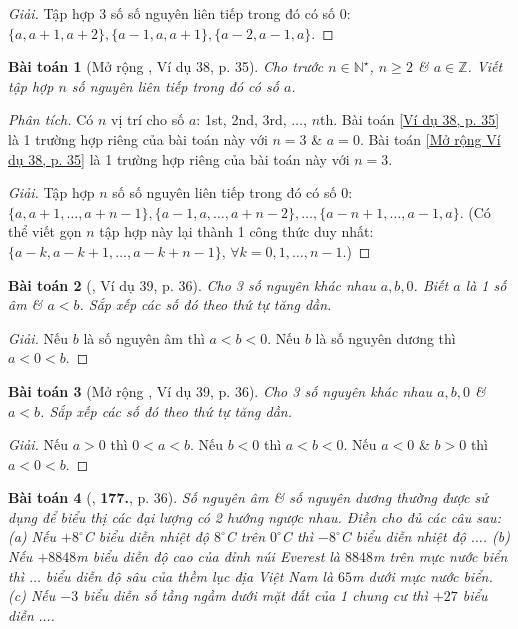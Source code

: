 \documentclass{article}
\numberwithin{equation}{section}
\newtheorem{baitoan}{Bài toán}
\begin{document}
\begin{proof}[Giải]
	Tập hợp 3 số số nguyên liên tiếp trong đó có số $0$: $\{a,a + 1,a + 2\},\{a - 1,a,a + 1\},\{a - 2,a - 1,a\}$.
\end{proof}

\begin{baitoan}[Mở rộng \cite{Tuyen_Toan_6}, Ví dụ 38, p. 35]
	\label{prob: Mở rộng Ví dụ 38, p. 35}
	Cho trước $n\in\mathbb{N}^\star$, $n\ge2$ \& $a\in\mathbb{Z}$. Viết tập hợp $n$ số nguyên liên tiếp trong đó có số $a$.
\end{baitoan}
\noindent\textit{Phân tích.} Có $n$ vị trí cho số $a$: 1st, 2nd, 3rd, $\ldots$, $n$th. Bài toán \ref{Ví dụ 38, p. 35} là 1 trường hợp riêng của bài toán này với $n = 3$ \& $a = 0$. Bài toán \ref{Mở rộng Ví dụ 38, p. 35} là 1 trường hợp riêng của bài toán này với $n = 3$.

\begin{proof}[Giải]
	Tập hợp $n$ số số nguyên liên tiếp trong đó có số $0$: $\{a,a + 1,\ldots,a + n - 1\},\{a - 1,a,\ldots,a + n - 2\},\ldots,\{a - n + 1,\ldots,a - 1,a\}$. (Có thể viết gọn $n$ tập hợp này lại thành 1 công thức duy nhất: $\{a - k,a - k + 1,\ldots,a - k + n - 1\}$, $\forall k = 0,1,\ldots,n - 1$.)
\end{proof}

\begin{baitoan}[\cite{Tuyen_Toan_6}, Ví dụ 39, p. 36]
	Cho 3 số nguyên khác nhau $a,b,0$. Biết $a$ là 1 số âm \& $a < b$. Sắp xếp các số đó theo thứ tự tăng dần.
\end{baitoan}

\begin{proof}[Giải]
	Nếu $b$ là số nguyên âm thì $a < b < 0$. Nếu $b$ là số nguyên dương thì $a < 0 < b$.
\end{proof}

\begin{baitoan}[Mở rộng \cite{Tuyen_Toan_6}, Ví dụ 39, p. 36]
	Cho 3 số nguyên khác nhau $a,b,0$ \& $a < b$. Sắp xếp các số đó theo thứ tự tăng dần.
\end{baitoan}

\begin{proof}[Giải]
	Nếu $a > 0$ thì $0 < a < b$. Nếu $b < 0$ thì $a < b < 0$. Nếu $a < 0$ \& $b > 0$ thì $a < 0 < b$.
\end{proof}

\begin{baitoan}[\cite{Tuyen_Toan_6}, \textbf{177.}, p. 36]
	Số nguyên âm \& số nguyên dương thường được sử dụng để biểu thị các đại lượng có 2 hướng ngược nhau. Điền cho đủ các câu sau: (a) Nếu $+8^\circ$C biểu diễn nhiệt độ $8^\circ$C trên $0^\circ$C thì $-8^\circ$C biểu diễn nhiệt độ $\ldots$. (b) Nếu $+8848$\emph{m} biểu diễn độ cao của đỉnh núi Everest là $8848$\emph{m} trên mực nước biển thì $\ldots$ biểu diễn độ sâu của thềm lục địa Việt Nam là $65$\emph{m} dưới mực nước biển. (c) Nếu $-3$ biểu diễn số tầng ngầm dưới mặt đất của 1 chung cư thì $+27$ biểu diễn $\ldots$.
\end{baitoan}
\end{document}
